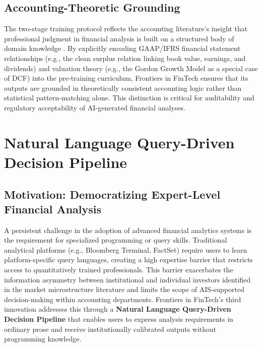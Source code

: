 \documentclass[12pt,letterpaper]{article}
\begin{document}
\subsection{Accounting-Theoretic Grounding}

The two-stage training protocol reflects the accounting literature's
insight that professional judgment in financial analysis is built on a
structured body of domain knowledge \citep{solomon1995}.
By explicitly encoding GAAP/IFRS financial statement relationships
(e.g., the clean surplus relation linking book value, earnings, and
dividends) and valuation theory (e.g., the Gordon Growth Model as a
special case of DCF) into the pre-training curriculum, Frontiers in FinTech ensures
that its outputs are grounded in theoretically consistent accounting
logic rather than statistical pattern-matching alone.
This distinction is critical for auditability and regulatory
acceptability of AI-generated financial analyses.

\section{Natural Language Query-Driven Decision Pipeline}
\label{sec:innovation3}

\subsection{Motivation: Democratizing Expert-Level Financial Analysis}

A persistent challenge in the adoption of advanced financial analytics
systems is the requirement for specialized programming or query skills.
Traditional analytical platforms (e.g., Bloomberg Terminal, FactSet)
require users to learn platform-specific query languages, creating a
high expertise barrier that restricts access to quantitatively trained
professionals.
This barrier exacerbates the information asymmetry between institutional
and individual investors identified in the market microstructure
literature \citep{kyle1985} and limits the scope of AIS-supported
decision-making within accounting departments.
Frontiers in FinTech's third innovation addresses this through a
\textbf{Natural Language Query-Driven Decision Pipeline} that enables
users to express analysis requirements in ordinary prose and receive
institutionally calibrated outputs without programming knowledge.
\end{document}
